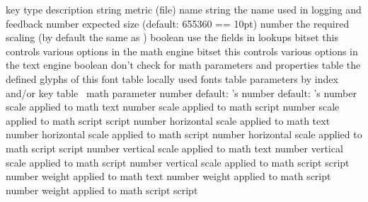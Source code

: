 {\starttabulate[|l|l|pl|]
\FL
\BC key                        \BC type    \BC description \NC \NR
\ML
\NC {}               \NC string  \NC metric (file) name \NC \NR
\NC {}           \NC string  \NC the name used in logging and feedback \NC \NR
\NC {}         \NC number  \NC expected size (default: 655360 == 10pt) \NC \NR
\NC {}               \NC number  \NC the required scaling (by default the same as ) \NC \NR
\HL
\NC {}        \NC boolean \NC use the  fields in lookups        \NC \NR
\NC {}        \NC bitset  \NC this controls various options in the math engine \NC \NR
\NC {}        \NC bitset  \NC this controls various options in the text engine \NC \NR
\NC {}             \NC boolean \NC don't check for math parameters and properties   \NC \NR
\HL
\NC {}         \NC table   \NC the defined glyphs of this font \NC \NR
\NC {}              \NC table   \NC locally used fonts              \NC \NR
\NC {}         \NC table   \NC parameters by index and/or key  \NC \NR
\NC {}      \NC table   \NC \OPENTYPE\ math parameter       \NC \NR
\HL
\NC {}         \NC number  \NC default: \TEX's \type {\hyphenchar} \NC \NR
\NC {}           \NC number  \NC default: \TEX's \type {\skewchar}   \NC \NR
\HL
\NC {}          \NC number  \NC scale applied to math text          \NC \NR
\NC {}        \NC number  \NC scale applied to math script        \NC \NR
\NC {}  \NC number  \NC scale applied to math script script \NC \NR
\HL
\NC {}         \NC number  \NC horizontal scale applied to math text          \NC \NR
\NC {}       \NC number  \NC horizontal scale applied to math script        \NC \NR
\NC {} \NC number  \NC horizontal scale applied to math script script \NC \NR
\HL
\NC {}         \NC number  \NC vertical scale applied to math text          \NC \NR
\NC {}       \NC number  \NC vertical scale applied to math script        \NC \NR
\NC {} \NC number  \NC vertical scale applied to math script script \NC \NR
\HL
\NC {}         \NC number  \NC weight  applied to math text          \NC \NR
\NC {}       \NC number  \NC weight  applied to math script        \NC \NR
\NC {} \NC number  \NC weight  applied to math script script \NC \NR
\LL
\stoptabulate

}
